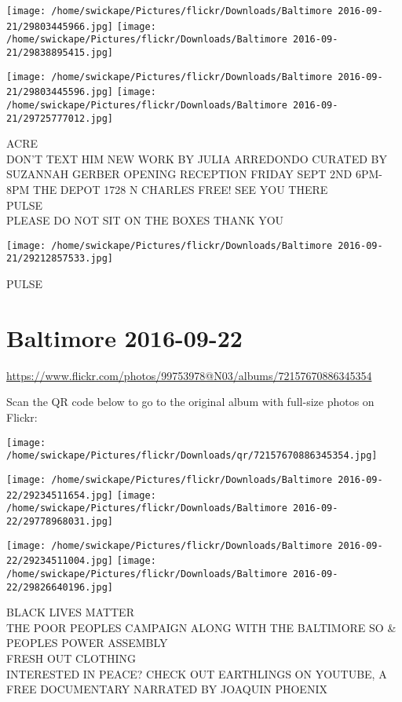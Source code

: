 \documentclass[10pt,letterpaper]{article}
\begin{document}
\texttt{[image: /home/swickape/Pictures/flickr/Downloads/Baltimore 2016-09-21/29803445966.jpg]}
\texttt{[image: /home/swickape/Pictures/flickr/Downloads/Baltimore 2016-09-21/29838895415.jpg]}

\texttt{[image: /home/swickape/Pictures/flickr/Downloads/Baltimore 2016-09-21/29803445596.jpg]}
\texttt{[image: /home/swickape/Pictures/flickr/Downloads/Baltimore 2016-09-21/29725777012.jpg]}

ACRE\\
DON'T TEXT HIM NEW WORK BY JULIA ARREDONDO CURATED BY SUZANNAH GERBER OPENING RECEPTION FRIDAY SEPT 2ND 6PM{-}8PM THE DEPOT 1728 N CHARLES FREE! SEE YOU THERE\\
PULSE\\
PLEASE DO NOT SIT ON THE BOXES THANK YOU
\pagebreak

\texttt{[image: /home/swickape/Pictures/flickr/Downloads/Baltimore 2016-09-21/29212857533.jpg]}

PULSE
\pagebreak

\section*{Baltimore 2016-09-22}

\url{https://www.flickr.com/photos/99753978@N03/albums/72157670886345354}

Scan the QR code below to go to the original album with full-size photos on Flickr:

\texttt{[image: /home/swickape/Pictures/flickr/Downloads/qr/72157670886345354.jpg]}
\pagebreak

\texttt{[image: /home/swickape/Pictures/flickr/Downloads/Baltimore 2016-09-22/29234511654.jpg]}
\texttt{[image: /home/swickape/Pictures/flickr/Downloads/Baltimore 2016-09-22/29778968031.jpg]}

\texttt{[image: /home/swickape/Pictures/flickr/Downloads/Baltimore 2016-09-22/29234511004.jpg]}
\texttt{[image: /home/swickape/Pictures/flickr/Downloads/Baltimore 2016-09-22/29826640196.jpg]}

BLACK LIVES MATTER\\
THE POOR PEOPLES CAMPAIGN ALONG WITH THE BALTIMORE SO \& PEOPLES POWER ASSEMBLY\\
FRESH OUT CLOTHING\\
INTERESTED IN PEACE?  CHECK OUT EARTHLINGS ON YOUTUBE, A FREE DOCUMENTARY NARRATED BY JOAQUIN PHOENIX
\pagebreak
\end{document}
